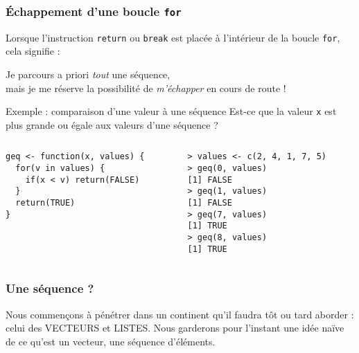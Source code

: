 \documentclass[10pt]{beamer}
\begin{document}
\begin{frame}[fragile]
  \frametitle{Échappement d'une boucle \texttt{for}}
  Lorsque l'instruction \texttt{return} ou \texttt{break} est placée à l'intérieur de la boucle \texttt{for}, cela signifie :
  \begin{center}
    \alert{Je parcours a priori \emph{tout} une séquence,\\ mais je me réserve la possibilité de \emph{m'échapper} en cours de route !}

  \end{center}
\begin{exampleblock}{Exemple : comparaison d'une valeur à une séquence}
  Est-ce que la valeur \texttt{x} est plus grande ou égale aux valeurs d’une séquence ?
\begin{columns}[t]
\begin{column}{0.48\textwidth}
  \begin{lstlisting}[style=editor]
geq <- function(x, values) {
  for(v in values) {
    if(x < v) return(FALSE)
  }
  return(TRUE)
}
  \end{lstlisting}
\end{column}
\begin{column}{0.48\textwidth}
  \begin{lstlisting}
> values <- c(2, 4, 1, 7, 5)
> geq(0, values)
[1] FALSE
> geq(1, values)
[1] FALSE
> geq(7, values)
[1] TRUE
> geq(8, values)
[1] TRUE
\end{lstlisting}

\end{column}
\end{columns}
\end{exampleblock}
\end{frame}

\begin{frame}
  \frametitle{Une séquence ?}
  Nous commençons à pénétrer dans un continent qu'il faudra tôt ou tard aborder : celui des \alert{VECTEURS} et \alert{LISTES}.
  Nous garderons pour l'instant une idée naïve de ce qu'est un vecteur, une \alert{séquence d’éléments}.
\end{frame}
\end{document}
